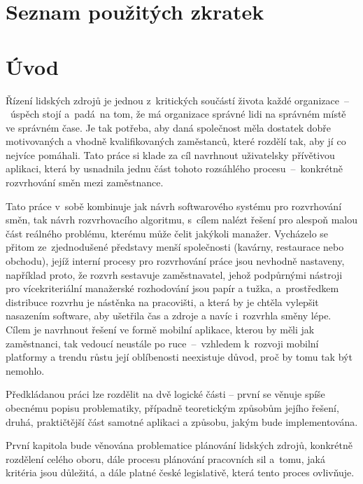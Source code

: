 \documentclass[twoside]{ctuthesis}
\begin{document}
\maketitle
\chapter*{Seznam použitých zkratek}
\printnoidxglossaries
{}
%
\chapter*{Úvod}

Řízení lidských zdrojů je jednou z~kritických součástí života každé organizace~–~úspěch stojí a~padá~na tom, že má organizace správné lidi na správném místě ve správném čase. Je tak potřeba, aby daná společnost měla dostatek dobře motivovaných a vhodně kvalifikovaných zaměstanců, které rozdělí tak, aby jí co nejvíce pomáhali. Tato práce si klade za cíl navrhnout uživatelsky přívětivou aplikaci, která by usnadnila jednu část tohoto rozsáhlého procesu~–~konkrétně rozvrhování směn mezi zaměstnance.

Tato práce v~sobě kombinuje jak návrh softwarového systému pro rozvrhování směn, tak návrh rozvrhovacího algoritmu, s~cílem nalézt řešení pro alespoň malou část reálného problému, kterému může čelit jakýkoli manažer. Vycházelo se přitom ze~zjednodušené představy menší společnosti (kavárny, restaurace nebo obchodu), jejíž interní procesy pro rozvrhování práce jsou nevhodně nastaveny, například proto, že rozvrh sestavuje zaměstnavatel, jehož podpůrnými nástroji pro vícekriteriální manažerské rozhodování jsou papír a tužka, a~prostředkem distribuce rozvrhu je nástěnka na pracovišti, a která by je chtěla vylepšit nasazením software, aby ušetřila čas a zdroje a navíc i~rozvrhla směny lépe. Cílem je navrhnout řešení ve formě mobilní aplikace, kterou by měli jak zaměstnanci, tak vedoucí neustále po ruce~–~vzhledem k~rozvoji mobilní platformy a trendu růstu její oblíbenosti neexistuje důvod, proč by tomu tak být nemohlo.

Předkládanou práci lze rozdělit na dvě logické části – první se věnuje spíše obecnému popisu problematiky, případně teoretickým způsobům jejího řešení, druhá, praktičtější část samotné aplikaci a způsobu, jakým bude implementována.

První kapitola bude věnována problematice plánování lidských zdrojů, konkrétně rozdělení celého oboru, dále procesu plánování pracovních sil a~tomu, jaká kritéria jsou důležitá, a dále platné české legislativě, která tento proces ovlivňuje.
\end{document}
